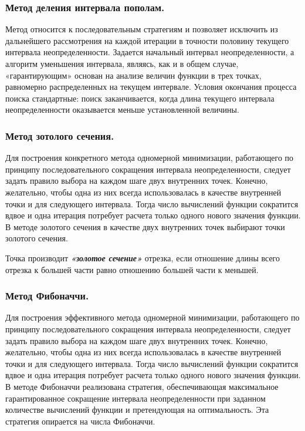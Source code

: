 \documentclass[a4paper, 12pt]{article}   	%
\begin{document}
\subsubsection{Метод деления интервала пополам.}
    Метод относится к последовательным стратегиям и позволяет исключить из дальнейшего рассмотрения на каждой итерации в точности половину текущего интервала неопределенности. Задается начальный интервал неопределенности, а алгоритм уменьшения интервала, являясь, как и в общем случае, «гарантирующим» основан на анализе величин функции в трех точках, равномерно распределенных на текущем интервале. Условия окончания процесса поиска стандартные: поиск заканчивается, когда длина текущего интервала неопределенности оказывается меньше установленной величины. 

\subsubsection{Метод зотолого сечения.}
    Для построения конкретного метода одномерной минимизации, работающего по принципу последовательного сокращения интервала неопределенности, следует задать правило выбора на каждом шаге двух внутренних точек. Конечно, желательно, чтобы одна из них всегда использовалась в качестве внутренней точки и для следующего интервала. Тогда число вычислений функции сократится вдвое и одна итерация потребует расчета только одного нового значения функции. В методе золотого сечения в качестве двух внутренних точек выбирают точки золотого сечения.

    Точка производит \textit{\textbf{«золотое сечение»}} отрезка, если отношение длины всего отрезка к большей части равно отношению большей части к меньшей.

\subsubsection{Метод Фибоначчи.}
    Для построения эффективного метода одномерной минимизации, работающего по принципу последовательного сокращения интервала неопределенности, следует задать правило выбора на каждом шаге двух внутренних точек. Конечно, желательно, чтобы одна из них всегда использовалась в качестве внутренней точки и для следующего интервала. Тогда число вычислений функции сократится вдвое и одна итерация потребует расчета только одного нового значения функции. В методе Фибоначчи реализована стратегия, обеспечивающая максимальное гарантированное сокращение интервала неопределенности при заданном количестве вычислений функции и претендующая на оптимальность. Эта стратегия опирается на числа Фибоначчи.
\end{document}
